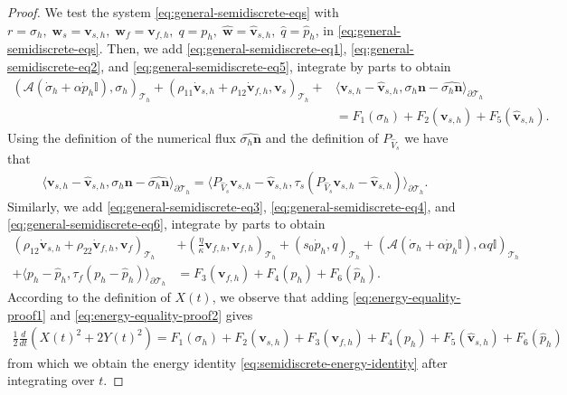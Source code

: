 \documentclass[10pt,letterpaper]{amsart}
\theoremstyle{plain} %
\theoremstyle{remark} %
\newcommand{\vect}[1]{\mathbf{#1}}
\newcommand{\Id}{\mathbb{I}} %
\newcommand{\Ael}{\mathcal{A}} %
\newcommand{\Thprod}[2]{( #1, #2 )_{\mathcal{T}_h}}
\newcommand{\pThprod}[2]{\langle #1, #2 \rangle_{\partial \mathcal{T}_{h}}}
\begin{document}
\begin{proof}
	We test the system \eqref{eq:general-semidiscrete-eqs} with $r = \sigma_h, \; \vect{w}_s = \vect{v}_{s,h}, \; \vect{w}_f = \vect{v}_{f,h}, \; q = p_h, \; \widehat{\vect{w}}=\widehat{\vect{v}}_{s,h}, \; \widehat{q} = \widehat{p}_h$, in \eqref{eq:general-semidiscrete-eqs}. Then, we add \eqref{eq:general-semidiscrete-eq1}, \eqref{eq:general-semidiscrete-eq2}, and \eqref{eq:general-semidiscrete-eq5}, integrate by parts to obtain
	\begin{align}
		\nonumber
		\Thprod{\Ael(\dot{\sigma}_{h} + \alpha \dot{p}_{h} \Id)}{\sigma_h}+ \Thprod{\rho_{11}\dot{\vect{v}}_{s,h} + \rho_{12}\dot{\vect{v}}_{f,h}}{\vect{v}_{s}}  + &\pThprod{\vect{v}_{s,h} - \widehat{\vect{v}}_{s,h}}{ \sigma_h \vect{n} - \widehat{\sigma_h \vect{n} }} 
		\\
	\label{eq:energy-equality-proof1}
		&= F_1(\sigma_h) + F_2(\vect{v}_{s,h}) + F_5(\widehat{\vect{v}}_{s,h}).
	\end{align}
	Using the definition of the numerical flux $\widehat{\sigma_h \vect{n} }$ and the definition of ${P_{\widehat{V}_s}}$ we have that 
	\begin{align*}
		\pThprod{\vect{v}_{s,h} - \widehat{\vect{v}}_{s,h}}{ \sigma_h \vect{n} - \widehat{\sigma_h \vect{n} }} = 
		\pThprod{ P_{\widehat{V}_s}\vect{v}_{s,h} - \widehat{\vect{v}}_{s,h} }{  \tau_{s}\left( {P_{\widehat{V}_s}}\vect{v}_{s,h} - \widehat{\vect{v}}_{s,h}  \right)} .
	\end{align*}
	Similarly, we add \eqref{eq:general-semidiscrete-eq3}, \eqref{eq:general-semidiscrete-eq4}, and \eqref{eq:general-semidiscrete-eq6}, integrate by parts to obtain
	\begin{align}
		\nonumber
		\Thprod{\rho_{12}\dot{\vect{v}}_{s,h} + \rho_{22}\dot{\vect{v}}_{f,h}}{\vect{v}_{f}} &+ \Thprod{\frac{\eta}{\kappa} \vect{v}_{f,h}}{\vect{v}_{f,h}}+
		\Thprod{s_{0}\dot{p}_{h}}{q} + \Thprod{\Ael(\dot{\sigma}_{h}+\alpha \dot{p}_{h}\Id)}{\alpha q\Id} \\
		\label{eq:energy-equality-proof2}
		+ \pThprod{p_h-\widehat{p}_h}{\tau_f(p_h - \widehat{p}_h)} & = F_{3}(\vect{v}_{f,h}) + F_{4}(p_h) + F_{6}(\widehat{p}_h) .
	\end{align}
	According to the definition of $X(t)$, we observe that adding \eqref{eq:energy-equality-proof1} and \eqref{eq:energy-equality-proof2} gives
	\begin{align*}
		\frac{1}{2}\frac{d}{dt} \left( X(t)^{2} + 2Y(t)^{2}\right)   =  F_1(\sigma_h) + F_2(\vect{v}_{s,h}) +F_{3}(\vect{v}_{f,h}) + F_{4}(p_h) +  F_5(\widehat{\vect{v}}_{s,h})+F_{6}(\widehat{p}_h)
	\end{align*}
	from which we obtain the energy identity \eqref{eq:semidiscrete-energy-identity} after integrating over $t$.
\end{proof}
\end{document}
